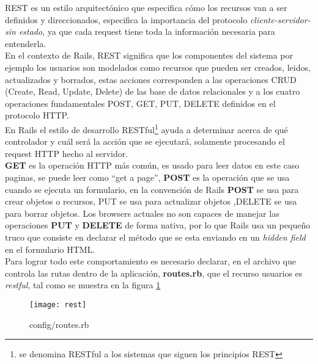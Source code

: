       REST es un estilo arquitectónico que especifica cómo los recursos van a ser definidos y direccionados, especifica la importancia del protocolo \emph{cliente-servidor-sin estado}, ya que cada request tiene toda la información necesaria para entenderla.\\

      En el contexto de Rails, REST significa que los componentes del sistema por ejemplo los usuarios son modelados como recursos que pueden ser creados, leidos, actualizados y borrados, estas acciones corresponden a las operaciones CRUD (Create, Read, Update, Delete) de las base de datos relacionales  y a los cuatro operaciones fundamentales POST, GET, PUT, DELETE definidos en el  protocolo HTTP.\\

      En Rails el estilo de desarrollo RESTful\footnote{se denomina RESTful a los sistemas que siguen los principios REST} ayuda a determinar acerca de qué controlador y cuál será la acción que se ejecutará, solamente procesando el request HTTP hecho al servidor.\\

      \textbf{GET} es la operación HTTP más común, es usado para leer datos en este caso paginas, se puede leer como ``get a page'', \textbf{POST} es la operación que se usa cuando se ejecuta un formulario, en la convención de Rails \textbf{POST} se usa para crear objetos o recursos, PUT se usa para actualizar objetos ,DELETE se usa para borrar objetos.  Los browsers actuales no son capaces de manejar las operaciones \textbf{PUT} y \textbf{DELETE} de forma nativa, por lo que Rails usa un pequeño truco que consiste en declarar el método que se esta enviando en un \emph{hidden field} en el formulario HTML.\\

      Para lograr todo este comportamiento  es necesario declarar, en el archivo que controla las rutas dentro de la aplicación, \textbf{routes.rb}, que el recurso usuarios es \emph{restful}, tal como se muestra en la figura \ref{fig:rest}\\

      \begin{figure}[!hbp]
        \begin{center}
          \texttt{[image: rest]}
        \end{center}
        \caption[REST - routes.rb]{config/routes.rb}
        \label{fig:rest}
      \end{figure}

